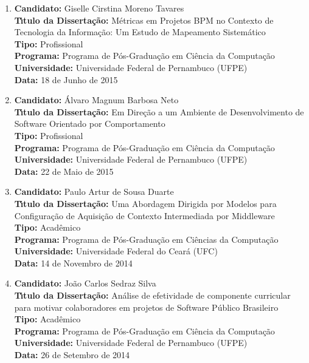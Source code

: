 \documentclass[a4paper,oneside,10pt]{article}
\begin{document}
\begin{enumerate}
\item       \textbf{Candidato:} Giselle Cirstina Moreno Tavares \mbox{} \\
            \textbf{T\'{\i}tulo da Disserta\c{c}\~{a}o:} Métricas em Projetos BPM no Contexto de Tecnologia da Informação: Um Estudo de Mapeamento Sistemático\\
            \textbf{Tipo:} Profissional\\
            \textbf{Programa:} Programa de Pós-Graduação em Ciência da Computação\\
            \textbf{Universidade:} Universidade Federal de Pernambuco (UFPE)\\
            \textbf{Data:} 18 de Junho de 2015

\item       \textbf{Candidato:} Álvaro Magnum Barbosa Neto \mbox{} \\
            \textbf{T\'{\i}tulo da Disserta\c{c}\~{a}o:} Em Direção a um Ambiente de Desenvolvimento de Software Orientado por Comportamento\\
            \textbf{Tipo:} Profissional\\
            \textbf{Programa:} Programa de Pós-Graduação em Ciência da Computação\\
            \textbf{Universidade:} Universidade Federal de Pernambuco (UFPE)\\
            \textbf{Data:} 22 de Maio de 2015

\item       \textbf{Candidato:} Paulo Artur de Sousa Duarte \mbox{} \\
            \textbf{T\'{\i}tulo da Disserta\c{c}\~{a}o:} Uma Abordagem Dirigida por Modelos para Configuração de Aquisição de Contexto Intermediada por Middleware\\
            \textbf{Tipo:} Acadêmico\\
            \textbf{Programa:} Programa de Pós-Graduação em Ciências da Computação\\
            \textbf{Universidade:} Universidade Federal do Ceará (UFC)\\
            \textbf{Data:} 14 de Novembro de 2014

\item       \textbf{Candidato:} João Carlos Sedraz Silva \mbox{} \\
            \textbf{T\'{\i}tulo da Disserta\c{c}\~{a}o:} Análise de efetividade de componente curricular para motivar colaboradores em projetos de Software Público Brasileiro\\
            \textbf{Tipo:} Acadêmico\\
            \textbf{Programa:} Programa de Pós-Graduação em Ciência da Computação\\
            \textbf{Universidade:} Universidade Federal de Pernambuco (UFPE)\\
            \textbf{Data:} 26 de Setembro de 2014


\end{enumerate}
\end{document}
